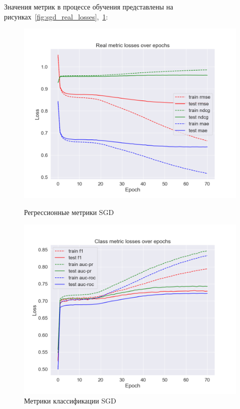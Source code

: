 Значения метрик в процессе обучения представлены на рисунках~\ref{fig:sgd_real_losses},~\ref{fig:sgd_class_losses}:

\begin{figure}[h!]
\centering
\begin{minipage}{.5\textwidth}
\centering
\includegraphics[width=1.0\linewidth]{images/sgd/real_losses}
\caption{Регрессионные метрики SGD}
\label{fig:sgd_real_losses}
\end{minipage}%
\begin{minipage}{.5\textwidth}
\centering
\includegraphics[width=1.0\linewidth]{images/sgd/class_losses}
\caption{Метрики классификации SGD}
\label{fig:sgd_class_losses}
\end{minipage}
\end{figure}

